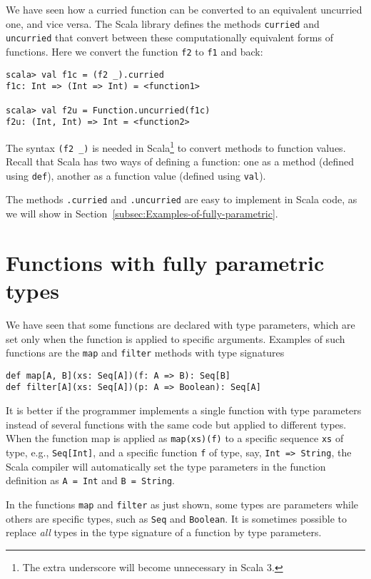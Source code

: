 We have seen how a curried function can be converted to an equivalent
uncurried one, and vice versa. The Scala library defines the methods
\lstinline!curried! and \lstinline!uncurried! that convert between
these computationally equivalent forms of functions. Here we convert
the function \lstinline!f2! to \lstinline!f1! and back:
\begin{lstlisting}
scala> val f1c = (f2 _).curried
f1c: Int => (Int => Int) = <function1>

scala> val f2u = Function.uncurried(f1c)
f2u: (Int, Int) => Int = <function2> 
\end{lstlisting}

The syntax \lstinline!(f2 _)! is needed in Scala\footnote{The extra underscore will become unnecessary in Scala 3.}
to convert methods to function values. Recall that Scala has two ways
of defining a function: one as a method (defined
using \lstinline!def!), another as a function value
(defined using \lstinline!val!). 

The methods \lstinline!.curried! and \lstinline!.uncurried! are
easy to implement in Scala code, as we will show in Section~\ref{subsec:Examples-of-fully-parametric}.

\section{Functions with fully parametric types}

We have seen that some functions are declared with type parameters,
which are set only when the function is applied to specific arguments.
Examples of such functions are the \lstinline!map! and \lstinline!filter!
methods with type signatures
\begin{lstlisting}
def map[A, B](xs: Seq[A])(f: A => B): Seq[B]
def filter[A](xs: Seq[A])(p: A => Boolean): Seq[A]
\end{lstlisting}
It is better if the programmer implements a single function with type
parameters instead of several functions with the same code but applied
to different types. When the function map is applied as \lstinline!map(xs)(f)!
to a specific sequence \lstinline!xs! of type, e.g., \lstinline!Seq[Int]!,
and a specific function \lstinline!f! of type, say, \lstinline!Int => String!,
the Scala compiler will automatically set the type parameters in the
function definition as \lstinline!A = Int! and \lstinline!B = String!.

In the functions \lstinline!map! and \lstinline!filter! as just
shown, some types are parameters while others are specific types,
such as \lstinline!Seq! and \lstinline!Boolean!. It is sometimes
possible to replace \emph{all} types in the type signature of a function
by type parameters.

